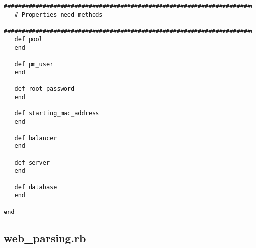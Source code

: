 \begin{lstlisting}
   
   #############################################################################
   # Properties need methods
   #############################################################################
   def pool
   end
   
   def pm_user
   end
   
   def root_password
   end
   
   def starting_mac_address
   end
   
   def balancer
   end
   
   def server
   end
   
   def database
   end
   
end
\end{lstlisting}


\subsection{web\_parsing.rb}


